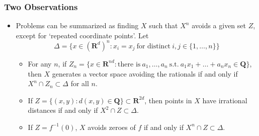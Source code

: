\documentclass[usenames,dvipsnames]{beamer}
\begin{document}
\begin{frame}
    \frametitle{Two Observations}

    \begin{itemize}
        \item Problems can be summarized as finding $X$ such that $X^n$ avoids a given set $Z$, except for `repeated coordinate points'. Let
        \[ \Delta = \{ x \in (\mathbf{R}^d)^n: x_i = x_j\ \text{for distinct}\ i,j \in \{ 1, \dots, n \} \} \]
        \vspace{-1.5em}


        \begin{itemize}
            \pause
           \item For any $n$, if $Z_n = \{ x \in \mathbf{R}^{nd}: \text{there is}\ a_1, \dots, a_n\ \text{s.t.}\ a_1x_1 + \dots + a_nx_n \in \mathbf{Q} \}$, then $X$ generates a vector space avoiding the rationals if and only if $X^n \cap Z_n \subset \Delta$ for all $n$.

           \pause
            \item If $Z = \{ (x,y): d(x,y) \in \mathbf{Q} \} \subset \mathbf{R}^{2d}$, then points in $X$ have irrational distances if and only if $X^2 \cap Z \subset \Delta$.

            \pause
            \item If $Z = f^{-1}(0)$, $X$ avoids zeroes of $f$ if and only if $X^n \cap Z \subset \Delta$.
        \end{itemize}
    \end{itemize}
\end{frame}
\end{document}
